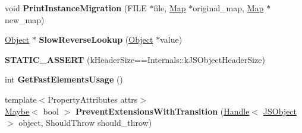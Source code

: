 \begin{DoxyCompactItemize}
\item 
void {\bfseries Print\+Instance\+Migration} (F\+I\+LE $\ast$file, \hyperlink{classv8_1_1internal_1_1_map}{Map} $\ast$original\+\_\+map, \hyperlink{classv8_1_1internal_1_1_map}{Map} $\ast$new\+\_\+map)\hypertarget{classv8_1_1internal_1_1_j_s_object_a3e219048c09af8905b93304bbb119f8d}{}\label{classv8_1_1internal_1_1_j_s_object_a3e219048c09af8905b93304bbb119f8d}

\item 
\hyperlink{classv8_1_1internal_1_1_object}{Object} $\ast$ {\bfseries Slow\+Reverse\+Lookup} (\hyperlink{classv8_1_1internal_1_1_object}{Object} $\ast$value)\hypertarget{classv8_1_1internal_1_1_j_s_object_ab8ea3e6f2a56010d4cb64faf49c87216}{}\label{classv8_1_1internal_1_1_j_s_object_ab8ea3e6f2a56010d4cb64faf49c87216}

\item 
{\bfseries S\+T\+A\+T\+I\+C\+\_\+\+A\+S\+S\+E\+RT} (k\+Header\+Size==Internals\+::k\+J\+S\+Object\+Header\+Size)\hypertarget{classv8_1_1internal_1_1_j_s_object_a627ceb9c7966102a33d1f0df7d74ca3c}{}\label{classv8_1_1internal_1_1_j_s_object_a627ceb9c7966102a33d1f0df7d74ca3c}

\item 
int {\bfseries Get\+Fast\+Elements\+Usage} ()\hypertarget{classv8_1_1internal_1_1_j_s_object_a781239b2920e67a657f230cc760a1132}{}\label{classv8_1_1internal_1_1_j_s_object_a781239b2920e67a657f230cc760a1132}

\item 
{\footnotesize template$<$Property\+Attributes attrs$>$ }\\\hyperlink{classv8_1_1_maybe}{Maybe}$<$ bool $>$ {\bfseries Prevent\+Extensions\+With\+Transition} (\hyperlink{classv8_1_1internal_1_1_handle}{Handle}$<$ \hyperlink{classv8_1_1internal_1_1_j_s_object}{J\+S\+Object} $>$ object, Should\+Throw should\+\_\+throw)\hypertarget{classv8_1_1internal_1_1_j_s_object_a0b6eb22e303860dc8b4ad5b08b3a1c12}{}\label{classv8_1_1internal_1_1_j_s_object_a0b6eb22e303860dc8b4ad5b08b3a1c12}

\end{DoxyCompactItemize}

